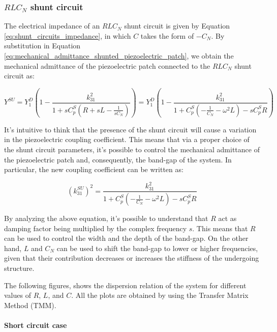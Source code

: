 \subsubsection{$RLC_N$ shunt circuit}
\label{subsubsec:RLC_shunt_circuit_negative_capacitance}

The electrical impedance of an $RLC_N$ shunt circuit is given by Equation \ref{eq:shunt_circuits_impedance}, in which $C$ takes the form of $-C_N$.
By substitution in Equation \ref{eq:mechanical_admittance_shunted_piezoelectric_patch}, we obtain the mechanical admittance of the piezoelectric patch connected to the $RLC_N$ shunt circuit as:

\begin{equation}
    Y^{SU} = Y_1^D \left( 1 - \frac{k_{31}^2}{1 + s C_p^S \left( R + sL - \frac{1}{sC_N} \right)} \right) = Y_1^D \left( 1 - \frac{k_{31}^2}{1 + C_p^S \left( -\frac{1}{C_N} - \omega^2 L \right) - s C_p^S R} \right)
    \label{eq:mechanical_admittance_RLC_shunt}
\end{equation}

It's intuitive to think that the presence of the shunt circuit will cause a variation in the piezoelectric coupling coefficient.
This means that via a proper choice of the shunt circuit parameters, it's possible to control the mechanical admittance of the piezoelectric patch and, consequently, the band-gap of the system.
In particular, the new coupling coefficient can be written as:

\begin{equation}
    (k_{31}^{SU})^2 = \frac{k_{31}^2}{1 + C_p^S \left( -\frac{1}{C_N} - \omega^2 L \right) - s C_p^S R}
    \label{eq:coupling_coefficient_RLC_shunt}
\end{equation}

By analyzing the above equation, it's possible to understand that $R$ act as damping factor being multiplied by the complex frequency $s$.
This means that $R$ can be used to control the width and the depth of the band-gap.
On the other hand, $L$ and $C_N$ can be used to shift the band-gap to lower or higher frequencies, given that their contribution decreases or increases the stiffness of the undergoing structure.

The following figures, shows the dispersion relation of the system for different values of $R$, $L$, and $C$.
All the plots are obtained by using the Transfer Matrix Method (TMM).


\paragraph{Short circuit case}

